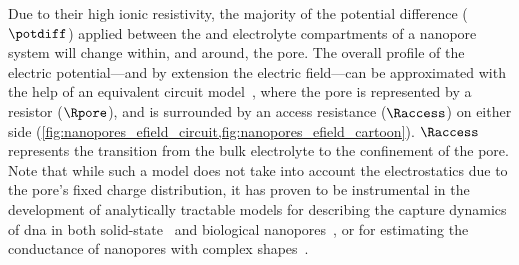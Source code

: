 Due to their high ionic resistivity, the majority of the potential difference ($\potdiff$) applied between the
\cisi{} and \transi{} electrolyte compartments of a nanopore system will change within, and around, the pore.
The overall profile of the electric potential---and by extension the electric field---can be approximated with
the help of an equivalent circuit model~\cite{Wanunu-2009,Grosberg-2010,Kowalczyk-2011}, where the pore is
represented by a resistor ($\Rpore$), and is surrounded by an access resistance ($\Raccess$) on either side
(\cref{fig:nanopores_efield_circuit,fig:nanopores_efield_cartoon}). $\Raccess$ represents the transition from
the bulk electrolyte to the confinement of the pore. Note that while such a model does not take into account
the electrostatics due to the pore's fixed charge distribution, it has proven to be instrumental in the
development of analytically tractable models for describing the capture dynamics of \gls{dna} in both
solid-state~\cite{Wanunu-2009,Grosberg-2010,Muthukumar-2010} and biological
nanopores~\cite{Chinappi-2015,Nomidis-2018}, or for estimating the conductance of nanopores with complex
shapes~\cite{Wanunu-2009,Kowalczyk-2011}.

